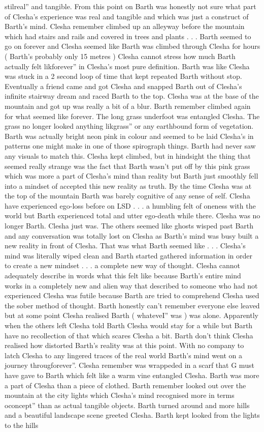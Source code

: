 \documentclass[12pt]{book}
\begin{document}
stilreal'' and tangible. From this point on Barth was honestly not sure what part of Clesha's experience was real and tangible and which was just a construct of Barth's mind. Clesha remember climbed up an alleyway before the mountain which had stairs and rails and covered in trees and plants . . .  Barth seemed to go on forever and Clesha seemed like Barth was climbed through Clesha for hours ( Barth's probably only 15 metres ) Clesha cannot stress how much Barth actually felt likforever'' in Clesha's most pure definition. Barth was like Clesha was stuck in a 2 second loop of time that kept repeated Barth without stop. Eventually a friend came and got Clesha and snapped Barth out of Clesha's infinite stairway dream and raced Barth to the top. Clesha was at the base of the mountain and got up was really a bit of a blur. Barth remember climbed again for what seemed like forever. The long grass underfoot was entangled Clesha. The grass no longer looked anything likgrass'' or any earthbound form of vegetation. Barth was actually bright neon pink in colour and seemed to be laid Clesha's in patterns one might make in one of those spirograph things. Barth had never saw any visuals to match this. Clesha kept climbed, but in hindsight the thing that seemed really strange was the fact that Barth wasn't put off by this pink grass which was more a part of Clesha's mind than reality but Barth just smoothly fell into a mindset of accepted this new reality as truth. By the time Clesha was at the top of the mountain Barth was barely cognitive of any sense of self. Clesha have experienced ego-loss before on LSD . . .  a humbling felt of oneness with the world but Barth experienced total and utter ego-death while there. Clesha was no longer Barth. Clesha just was. The others seemed like ghosts wisped past Barth and any conversation was totally lost on Clesha as Barth's mind was busy built a new reality in front of Clesha. That was what Barth seemed like . . .  Clesha's mind was literally wiped clean and Barth started gathered information in order to create a new mindset . . . a complete new way of thought. Clesha cannot adequately describe in words what this felt like because Barth's entire mind works in a completely new and alien way that described to someone who had not experienced Clesha was futile because Barth are tried to comprehend Clesha used the sober method of thought. Barth honestly can't remember everyone else leaved but at some point Clesha realised Barth ( whateveI'' was ) was alone. Apparently when the others left Clesha told Barth Clesha would stay for a while but Barth have no recollection of that which scares Clesha a bit. Barth don't think Clesha realised how distorted Barth's reality was at this point. With no company to latch Clesha to any lingered traces of the real world Barth's mind went on a journey througforever''. Clesha remember was wrappeded in a scarf that G must have gave to Barth which felt like a warm vine entangled Clesha. Barth was more a part of Clesha than a piece of clothed. Barth remember looked out over the mountain at the city lights which Clesha's mind recognised more in terms oconcept'' than as actual tangible objects. Barth turned around and more hills and a beautiful landscape scene greeted Clesha. Barth kept looked from the lights to the hills 
\end{document}
